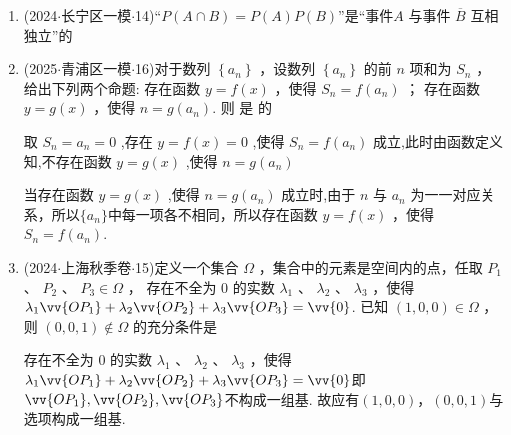 \begin{enumerate}
    \item (2024$\cdot$长宁区一模$\cdot$14)“$P(A \cap B) = P(A) P(B)$”是“事件$A$ 与事件 $\overline{B}$ 互相独立”的

    \item (2025$\cdot$青浦区一模$\cdot$16)对于数列 $\left\{  {a}_{n}\right\}$ ，设数列 $\left\{  {a}_{n}\right\}$ 的前 $n$ 项和为 ${S}_{n}$ ，给出下列两个命题:   存在函数 $y = f\left( x\right)$ ，使得 ${S}_{n} = f\left( {a}_{n}\right)$ ；   存在函数 $y = g\left( x\right)$ ，使得 $n = g\left( {a}_{n}\right)$. 则  是  的 
    \begin{jieda}
        取 ${S}_{n} = {a}_{n} = 0$ ,存在 $y = f\left( x\right)  = 0$ ,使得 ${S}_{n} = f\left( {a}_{n}\right)$ 成立,此时由函数定义知,不存在函数 $y = g\left( x\right)$ ,使得 $n =  g\left( {a}_{n}\right)$
        
        当存在函数 $y = g\left( x\right)$ ,使得 $n = g\left( {a}_{n}\right)$ 成立时,由于 $n$ 与 ${a}_{n}$ 为一一对应关系，所以$\{a_n\}$中每一项各不相同，所以存在函数 $y = f\left( x\right)$ ，使得 ${S}_{n} = f\left( {a}_{n}\right)$.
    \end{jieda}

    \item (2024$\cdot$上海秋季卷$\cdot$15)定义一个集合 $\Omega$ ，集合中的元素是空间内的点，任取 ${P}_{1}$ 、 ${P}_{2}$ 、 ${P}_{3} \in  \Omega$ ， 存在不全为 0 的实数 ${\lambda }_{1}$ 、 ${\lambda }_{2}$ 、 ${\lambda }_{3}$ ，使得 ${\lambda }_{1}\vv{O{P}_{1}} + {\lambda }_{2}\vv{O{P}_{2}} + {\lambda }_{3}\vv{O{P}_{3}} = \vv{0}$. 已知 $\left( {1,0,0}\right)  \in  \Omega$ ，则 $\left( {0,0,1}\right)  \notin  \Omega$ 的充分条件是 
    \begin{jieda}
        存在不全为 0 的实数 ${\lambda }_{1}$ 、 ${\lambda }_{2}$ 、 ${\lambda }_{3}$ ，使得 ${\lambda }_{1}\vv{O{P}_{1}} + {\lambda }_{2}\vv{O{P}_{2}} + {\lambda }_{3}\vv{O{P}_{3}} = \vv{0}$即$\vv{O{P}_{1}}, \vv{O{P}_{2}}, \vv{O{P}_{3}}$不构成一组基. 故应有$\left( {1,0,0}\right)，\left( {0,0,1}\right)$与选项构成一组基.
    \end{jieda}
\end{enumerate}


